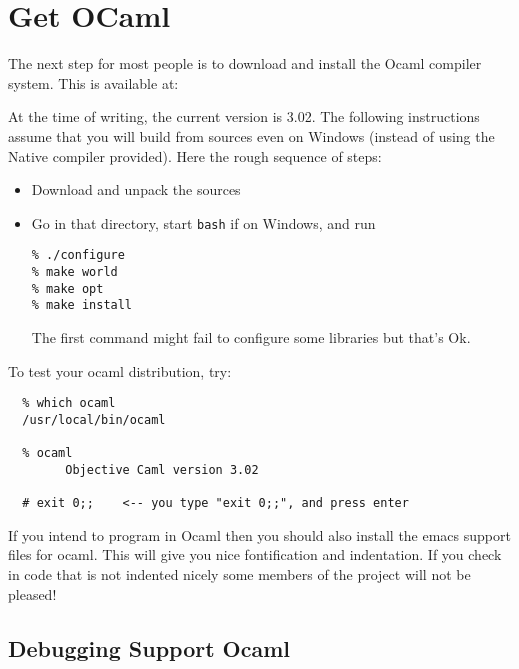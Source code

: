 \documentclass{article}
\def\t#1{{\tt #1}}
\begin{document}
\section{Get OCaml}\label{sec-ocaml}

The next step for most people is to download and install the Ocaml
compiler system.  This is available at:


At the time of writing, the current version is 3.02. The following
instructions assume that you will build from sources even on Windows (instead
of using the Native compiler provided). Here the rough sequence of steps:
\begin{itemize}
\item Download and unpack the sources
\item Go in that directory, start \t{bash} if on Windows, and run
\begin{verbatim}
% ./configure
% make world
% make opt
% make install
\end{verbatim}

 The first command might fail to configure some libraries but that's Ok. 
\end{itemize}

To test your ocaml distribution, try:

\begin{verbatim}
  % which ocaml
  /usr/local/bin/ocaml

  % ocaml
        Objective Caml version 3.02

  # exit 0;;    <-- you type "exit 0;;", and press enter
\end{verbatim}

 If you intend to program in Ocaml then you should also install the emacs
support files for ocaml. This will give you nice fontification and
indentation. If you check in code that is not indented nicely some members of
the project will not be pleased!

 \subsection{Debugging Support Ocaml}
\end{document}
